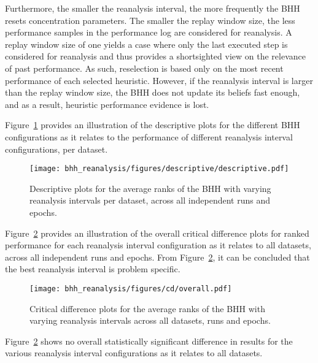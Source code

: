 Furthermore, the smaller the reanalysis interval, the more frequently the \acs{BHH} resets concentration parameters. The smaller the replay window size, the less performance samples in the performance log are considered for reanalysis. A replay window size of one yields a case where only the last executed step is considered for reanalysis and thus provides a shortsighted view on the relevance of past performance. As such, reselection is based only on the most recent performance of each selected heuristic. However, if the reanalysis interval is larger than the replay window size, the \acs{BHH} does not update its beliefs fast enough, and as a result, heuristic performance evidence is lost.

Figure~\ref{fig:results:reanalysis:descriptive:descriptive} provides an illustration of the descriptive plots for the different \acs{BHH} configurations as it relates to the performance of different reanalysis interval configurations, per dataset.

\begin{figure}[htb]
      \centering
      \texttt{[image: bhh\_reanalysis/figures/descriptive/descriptive.pdf]}
      \caption{Descriptive plots for the average ranks of the \acs{BHH} with varying reanalysis intervals per dataset, across all independent runs and epochs.}
      \label{fig:results:reanalysis:descriptive:descriptive}
\end{figure}

Figure~\ref{fig:results:reanalysis:descriptive:cd} provides an illustration of the overall critical difference plots for ranked performance for each reanalysis interval configuration as it relates to all datasets, across all independent runs and epochs. From Figure~\ref{fig:results:reanalysis:descriptive:cd}, it can be concluded that the best reanalysis interval is problem specific.

\begin{figure}[htb]
      \centering
      \texttt{[image: bhh\_reanalysis/figures/cd/overall.pdf]}
      \caption{Critical difference plots for the average ranks of the \acs{BHH} with varying reanalysis intervals across all datasets, runs and epochs.}
      \label{fig:results:reanalysis:descriptive:cd}
\end{figure}

Figure~\ref{fig:results:reanalysis:descriptive:cd} shows no overall statistically significant difference in results for the various reanalysis interval configurations as it relates to all datasets.


